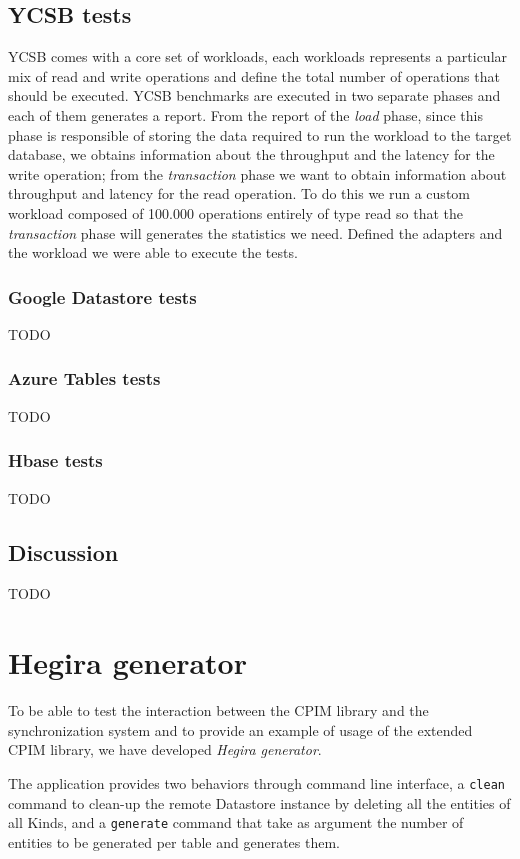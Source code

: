 \subsection{YCSB tests}
YCSB comes with a core set of workloads, each workloads represents a particular mix of read and write operations and define the total number of operations that should be executed. 
\noindent YCSB benchmarks are executed in two separate phases and each of them generates a report. From the report of the \textit{load} phase, since this phase is responsible of storing the data required to run the workload to the target database, we obtains information about the throughput and the latency for the write operation; from the \textit{transaction} phase we want to obtain information about throughput and latency for the read operation. To do this we run a custom workload composed of 100.000 operations entirely of type read so that the \textit{transaction} phase will generates the statistics we need.
\noindent Defined the adapters and the workload we were able to execute the tests.

\subsubsection{Google Datastore tests}
\newparagraph TODO

\subsubsection{Azure Tables tests}
\newparagraph TODO

\subsubsection{Hbase tests}
\newparagraph TODO

\subsection{Discussion}
\newparagraph TODO

\section{Hegira generator}
\label{sec:data}
To be able to test the interaction between the CPIM library and the synchronization system and to provide an example of usage of the extended CPIM library, we have developed \textit{Hegira generator}.

\noindent The application provides two behaviors through command line interface, a \texttt{clean} command to clean-up the remote Datastore instance by deleting all the entities of all Kinds, and a \texttt{generate} command that take as argument the number of entities to be generated per table and generates them.

